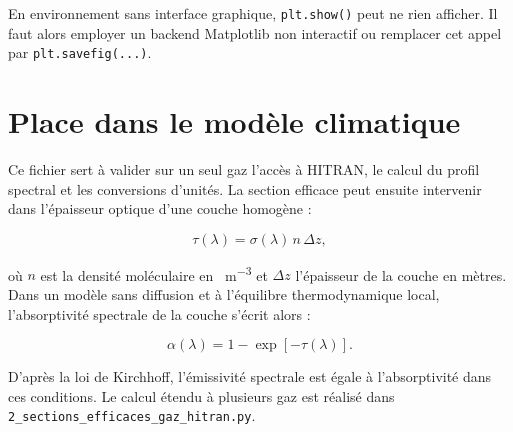 \documentclass[11pt,a4paper]{article}
\newcommand{\code}[1]{\texttt{#1}}
\begin{document}
En environnement sans interface graphique, \code{plt.show()} peut ne rien
afficher. Il faut alors employer un backend Matplotlib non interactif ou
remplacer cet appel par \code{plt.savefig(...)}.

\section{Place dans le modèle climatique}

Ce fichier sert à valider sur un seul gaz l'accès à HITRAN, le calcul du
profil spectral et les conversions d'unités. La section efficace peut ensuite
intervenir dans l'épaisseur optique d'une couche homogène :

\begin{equation}
  \tau(\lambda)=\sigma(\lambda)\,n\,\Delta z,
\end{equation}

où $n$ est la densité moléculaire en
\si{\molecule\per\metre\cubed} et $\Delta z$ l'épaisseur de la couche en
mètres. Dans un modèle sans diffusion et à l'équilibre thermodynamique local,
l'absorptivité spectrale de la couche s'écrit alors :

\begin{equation}
  \alpha(\lambda)=1-\exp[-\tau(\lambda)].
\end{equation}

D'après la loi de Kirchhoff, l'émissivité spectrale est égale à
l'absorptivité dans ces conditions. Le calcul étendu à plusieurs gaz est
réalisé dans \code{2\_sections\_efficaces\_gaz\_hitran.py}.
\end{document}
